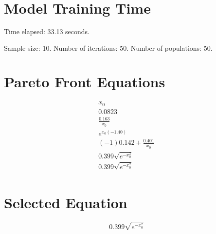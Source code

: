 \documentclass{article}
\begin{document}
\section*{Model Training Time}
Time elapsed: 33.13 seconds.

Sample size: 10.
Number of iterations: 50.
Number of populations: 50.

\section*{Pareto Front Equations}
\begin{align*}
x_{0} \\
0.0823 \\
\frac{0.163}{x_{0}} \\
e^{x_{0} \left(-1.40\right)} \\
\left(-1\right) 0.142 + \frac{0.401}{x_{0}} \\
0.399 \sqrt{e^{- x_{0}^{2}}} \\
0.399 \sqrt{e^{- x_{0}^{2}}} \\
\end{align*}

\section*{Selected Equation}
\[ 0.399 \sqrt{e^{- x_{0}^{2}}} \]
\end{document}
